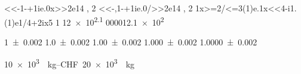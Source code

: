 \num{<<-1-+1ie.0x>>2e14 , 2}
\num{<<-,1-+1ie.0/>>2e14 , 2}
\num{1x>=2/<=3(1)e.1x<<4-i1.(1)e1/4+2ix5} %
\num[round-integer-to-decimal,zero-decimal-to-integer,round-mode=figures]{1} %
\num[scientific-notation=engineering]{12e2.1} %
\num[minimum-integer-digits=3,scientific-notation=engineering]{000012.1e2} %

\num{1 +- 0.002}
\num{1.0 +- 0.002}
\num{1.00 +- 0.002}
\num{1.000 +- 0.002}
\num{1.0000 +- 0.002}

\SIrange{10e3}{20e3}[CHF]{\per\kg} %
